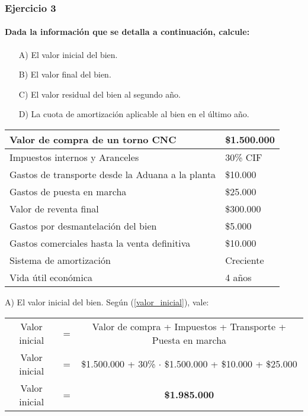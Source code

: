 \documentclass[12pt,a4paper]{article}
\newcommand{\consigna}[1]{\paragraph{\indent #1} \hspace{0pt}}
\begin{document}
        
        \newpage
    
    	\subsubsection{Ejercicio 3}
        
        \consigna{Dada la información que se detalla a continuación, calcule:}
        
        \begin{itemize}
			\item[A)]	El valor inicial del bien.
            \item[B)]	El valor final del bien.
            \item[C)]	El valor residual del bien al segundo año.
            \item[D)]	La cuota de amortización aplicable al bien en el último año.
		\end{itemize}
        
        \begin{table}[H]
        \centering
        	\begin{tabular}{ | l | l | }
            	\hline
            	Valor de compra de un torno CNC						&	\$1.500.000	\\ \hline
                Impuestos internos y Aranceles						&	30\% CIF	\\ \hline
                Gastos de transporte desde la Aduana a la planta	&	\$10.000	\\ \hline
                Gastos de puesta en marcha							&	\$25.000	\\ \hline
                Valor de reventa final								&	\$300.000	\\ \hline
                Gastos por desmantelación del bien					&	\$5.000		\\ \hline
                Gastos comerciales hasta la venta definitiva		&	\$10.000	\\ \hline
                Sistema de amortización								&	Creciente	\\ \hline
                Vida útil económica									&	4 años		\\ \hline
			\end{tabular}
		\end{table}
        
        A) El valor inicial del bien. Según (\ref{valor_inicial}), vale:

		\begin{table}[H]
		\centering
        	\begin{tabular}{ c c c }
            	Valor inicial	&=&		Valor de compra + Impuestos + Transporte + Puesta en marcha \\
                Valor inicial	&=&		\$1.500.000 + 30\% $\cdot$ \$1.500.000 + \$10.000 + \$25.000 \\
                Valor inicial	&=&		\textbf{\$1.985.000}
			\end{tabular}
		\end{table}
        
\end{document}

